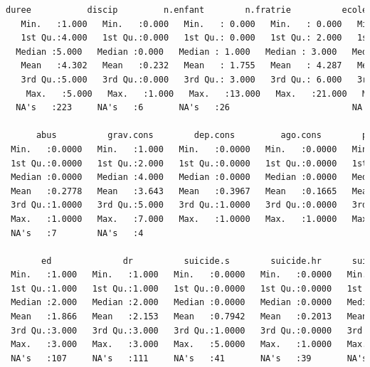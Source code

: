 \begin{lstlisting}[language=html]
                           duree           discip         n.enfant        n.fratrie          ecole         separation      juge.enfant         place       
   Min.   :1.000   Min.   :0.000   Min.   : 0.000   Min.   : 0.000   Min.   :1.000   Min.   :0.0000   Min.   :0.0000   Min.   :0.0000  
   1st Qu.:4.000   1st Qu.:0.000   1st Qu.: 0.000   1st Qu.: 2.000   1st Qu.:1.000   1st Qu.:0.0000   1st Qu.:0.0000   1st Qu.:0.0000  
  Median :5.000   Median :0.000   Median : 1.000   Median : 3.000   Median :2.000   Median :0.0000   Median :0.0000   Median :0.0000  
   Mean   :4.302   Mean   :0.232   Mean   : 1.755   Mean   : 4.287   Mean   :1.866   Mean   :0.4226   Mean   :0.2771   Mean   :0.2285  
   3rd Qu.:5.000   3rd Qu.:0.000   3rd Qu.: 3.000   3rd Qu.: 6.000   3rd Qu.:2.000   3rd Qu.:1.0000   3rd Qu.:1.0000   3rd Qu.:0.0000  
    Max.   :5.000   Max.   :1.000   Max.   :13.000   Max.   :21.000   Max.   :5.000   Max.   :1.0000   Max.   :1.0000   Max.   :1.0000  
  NA's   :223     NA's   :6       NA's   :26                        NA's   :5       NA's   :11       NA's   :5        NA's   :7       
 
      abus          grav.cons        dep.cons         ago.cons        ptsd.cons         alc.cons        subst.cons        scz.cons           char             rs       
 Min.   :0.0000   Min.   :1.000   Min.   :0.0000   Min.   :0.0000   Min.   :0.0000   Min.   :0.0000   Min.   :0.0000   Min.   :0.0000   Min.   :1.000   Min.   :1.000  
 1st Qu.:0.0000   1st Qu.:2.000   1st Qu.:0.0000   1st Qu.:0.0000   1st Qu.:0.0000   1st Qu.:0.0000   1st Qu.:0.0000   1st Qu.:0.0000   1st Qu.:1.000   1st Qu.:1.000  
 Median :0.0000   Median :4.000   Median :0.0000   Median :0.0000   Median :0.0000   Median :0.0000   Median :0.0000   Median :0.0000   Median :1.000   Median :2.000  
 Mean   :0.2778   Mean   :3.643   Mean   :0.3967   Mean   :0.1665   Mean   :0.2165   Mean   :0.1865   Mean   :0.2653   Mean   :0.0826   Mean   :1.512   Mean   :2.057  
 3rd Qu.:1.0000   3rd Qu.:5.000   3rd Qu.:1.0000   3rd Qu.:0.0000   3rd Qu.:0.0000   3rd Qu.:0.0000   3rd Qu.:1.0000   3rd Qu.:0.0000   3rd Qu.:2.000   3rd Qu.:3.000  
 Max.   :1.0000   Max.   :7.000   Max.   :1.0000   Max.   :1.0000   Max.   :1.0000   Max.   :1.0000   Max.   :1.0000   Max.   :1.0000   Max.   :4.000   Max.   :3.000  
 NA's   :7        NA's   :4        
                                                                                                      NA's   :96      NA's   :103    
       ed              dr          suicide.s        suicide.hr      suicide.past      dur.interv    
 Min.   :1.000   Min.   :1.000   Min.   :0.0000   Min.   :0.0000   Min.   :0.0000   Min.   :  0.00  
 1st Qu.:1.000   1st Qu.:1.000   1st Qu.:0.0000   1st Qu.:0.0000   1st Qu.:0.0000   1st Qu.: 48.00  
 Median :2.000   Median :2.000   Median :0.0000   Median :0.0000   Median :0.0000   Median : 60.00  
 Mean   :1.866   Mean   :2.153   Mean   :0.7942   Mean   :0.2013   Mean   :0.2841   Mean   : 61.89  
 3rd Qu.:3.000   3rd Qu.:3.000   3rd Qu.:1.0000   3rd Qu.:0.0000   3rd Qu.:1.0000   3rd Qu.: 75.00  
 Max.   :3.000   Max.   :3.000   Max.   :5.0000   Max.   :1.0000   Max.   :1.0000   Max.   :120.00  
 NA's   :107     NA's   :111     NA's   :41       NA's   :39       NA's   :14       NA's   :50      
 

\end{lstlisting}
